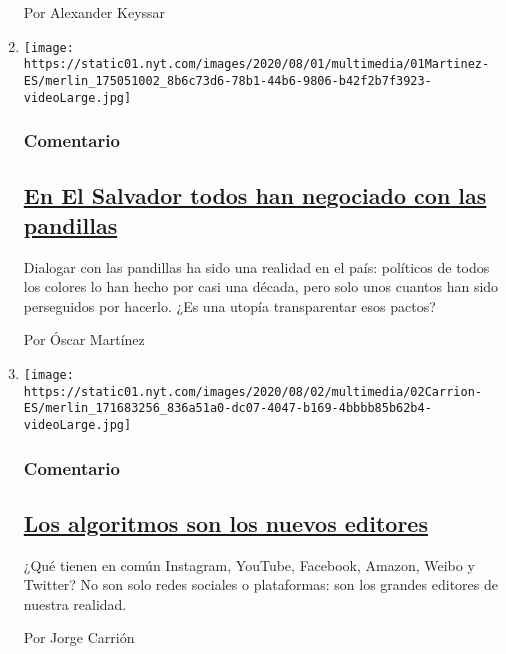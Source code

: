 \begin{enumerate}
  Por Alexander Keyssar
\item
  \texttt{[image: https://static01.nyt.com/images/2020/08/01/multimedia/01Martinez-ES/merlin\_175051002\_8b6c73d6-78b1-44b6-9806-b42f2b7f3923-videoLarge.jpg]}

  \hypertarget{comentario-2}{%
  \subsubsection{Comentario}\label{comentario-2}}

  \hypertarget{en-el-salvador-todos-han-negociado-con-las-pandillas}{%
  \subsection{\texorpdfstring{\href{/es/2020/08/02/espanol/opinion/pandillas-el-salvador.html}{En
  El Salvador todos han negociado con las
  pandillas}}{En El Salvador todos han negociado con las pandillas}}\label{en-el-salvador-todos-han-negociado-con-las-pandillas}}

  Dialogar con las pandillas ha sido una realidad en el país: políticos
  de todos los colores lo han hecho por casi una década, pero solo unos
  cuantos han sido perseguidos por hacerlo. ¿Es una utopía transparentar
  esos pactos?

  Por Óscar Martínez
\item
  \texttt{[image: https://static01.nyt.com/images/2020/08/02/multimedia/02Carrion-ES/merlin\_171683256\_836a51a0-dc07-4047-b169-4bbbb85b62b4-videoLarge.jpg]}

  \hypertarget{comentario-3}{%
  \subsubsection{Comentario}\label{comentario-3}}

  \hypertarget{los-algoritmos-son-los-nuevos-editores}{%
  \subsection{\texorpdfstring{\href{/es/2020/08/02/espanol/opinion/facebook-amazon-instagram.html}{Los
  algoritmos son los nuevos
  editores}}{Los algoritmos son los nuevos editores}}\label{los-algoritmos-son-los-nuevos-editores}}

  ¿Qué tienen en común Instagram, YouTube, Facebook, Amazon, Weibo y
  Twitter? No son solo redes sociales o plataformas: son los grandes
  editores de nuestra realidad.

  Por Jorge Carrión
\end{enumerate}

